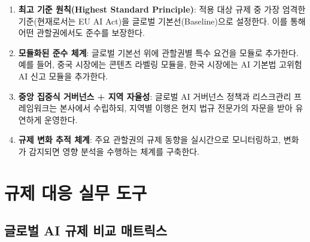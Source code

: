 \begin{enumerate}
 \item \textbf{최고 기준 원칙(Highest Standard Principle)}: 적용 대상 규제 중 가장 엄격한 기준(현재로서는 EU AI Act)을 글로벌 기본선(Baseline)으로 설정한다.\cite{bradford2020brussels} 이를 통해 어떤 관할권에서도 준수를 보장한다.
 \item \textbf{모듈화된 준수 체계}: 글로벌 기본선 위에 관할권별 특수 요건을 모듈로 추가한다. 예를 들어, 중국 시장에는 콘텐츠 라벨링 모듈을, 한국 시장에는 AI 기본법 고위험 AI 신고 모듈을 추가한다.
 \item \textbf{중앙 집중식 거버넌스 + 지역 자율성}: 글로벌 AI 거버넌스 정책과 리스크관리 프레임워크는 본사에서 수립하되, 지역별 이행은 현지 법규 전문가의 자문을 받아 유연하게 운영한다.
 \item \textbf{규제 변화 추적 체계}: 주요 관할권의 규제 동향을 실시간으로 모니터링하고, 변화가 감지되면 영향 분석을 수행하는 체계를 구축한다.
\end{enumerate}

\section{규제 대응 실무 도구}

\subsection{글로벌 AI 규제 비교 매트릭스}

